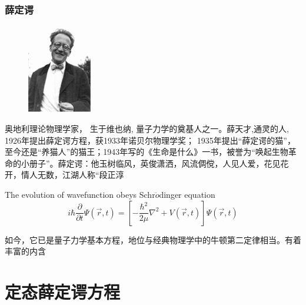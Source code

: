 \begin{frame}
    \frametitle{薛定谔}
    \begin{figure} %
        \includegraphics[width=0.25\textwidth]{figs/schroginger.png}   
    \end{figure}
奥地利理论物理学家， 生于维也纳, 量子力学的奠基人之一。薛天才,通灵的人, 1926年提出薛定谔方程，获1933年诺贝尔物理学奖； 1935年提出“薛定谔的猫”，至今还是“养猫人”的猫王；1943年写的《生命是什么》一书，被誉为“唤起生物革命的小册子”。薛定谔：他玉树临风，英俊潇洒，风流倜傥，人见人爱，花见花开，情人无数，江湖人称“段正淳
\end{frame}

\begin{frame}
    \begin{tcolorbox}[colback=yellow!10,colframe=red!75!black,title=Basic assumption 2/5]
        The evolution of wavefunction obeys Schr$\ddot{o}$dinger equation
        \begin{equation*}
            i\hbar \frac{\partial }{\partial t} \Psi (\overrightarrow{r},t ) =\left [ -\frac{\hbar^2}{2\mu }\nabla ^2 + V(\overrightarrow{r},t ) \right ]\Psi (\overrightarrow{r}, t ) 
        \end{equation*}
    \end{tcolorbox}
    如今，它已是量子力学基本方程，地位与经典物理学中的牛顿第二定律相当。有着丰富的内含
\end{frame}

\section{定态薛定谔方程}

